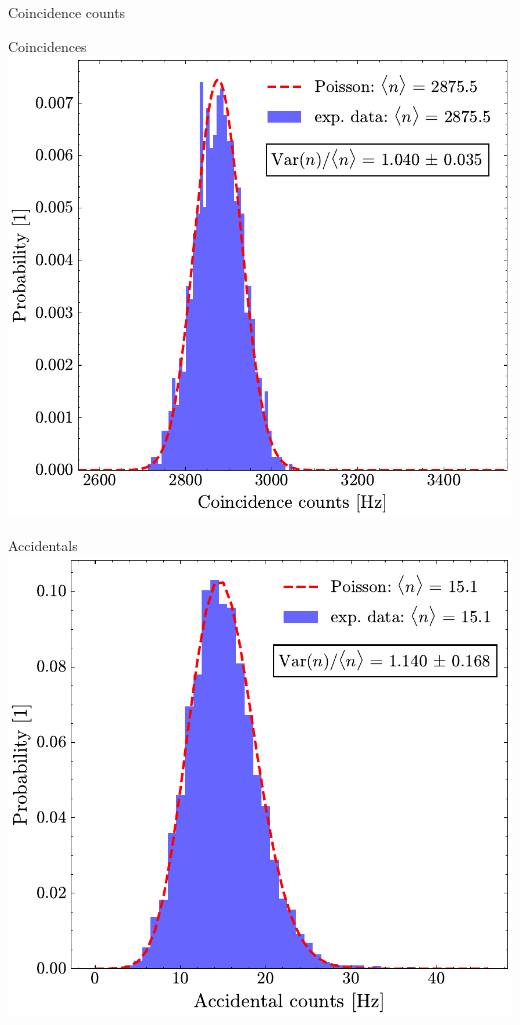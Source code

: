\documentclass[10pt,aspectratio=43]{beamer}
\begin{document}
	\begin{frame}{Coincidence counts}
		\begin{minipage}{.45\textwidth}
			\centering
			Coincidences
			\vspace{2em}
			\includegraphics[width=\textwidth]{Images/CoincStatistics_2.pdf}
		\end{minipage}
		\hfill
		\begin{minipage}{.45\textwidth}
			\centering
			Accidentals
			\vspace{2em}
			\includegraphics[width=\textwidth]{Images/AccCountsStatistics_2.pdf}
		\end{minipage}
	\end{frame}
	
\end{document}
